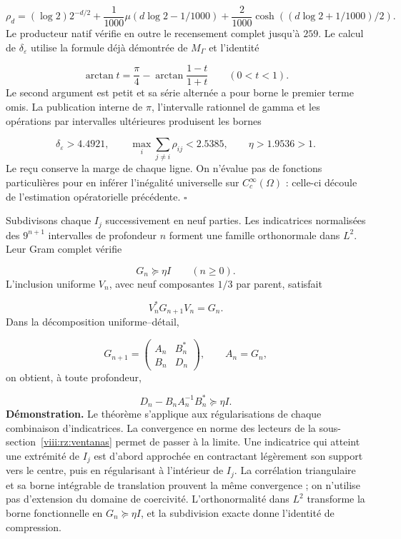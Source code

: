 \[
\rho_d=(\log2)2^{-d/2}
+\frac1{1000}\mu(d\log2-1/1000)
+\frac2{1000}\cosh((d\log2+1/1000)/2).
\]
Le producteur natif vérifie en outre le recensement complet jusqu'à \(259\). Le calcul de \(\delta_\varepsilon\) utilise la formule déjà démontrée de \(M_\Gamma\) et l'identité

\[
\arctan t=\frac\pi4-
\arctan\frac{1-t}{1+t}\qquad(0<t<1).
\]
Le second argument est petit et sa série alternée a pour borne le premier terme omis. La publication interne de \(\pi\), l’intervalle rationnel de gamma et les opérations par intervalles ultérieures produisent les bornes

\[
\delta_\varepsilon>4.4921,\qquad
\max_i\sum_{j\neq i}\rho_{ij}<2.5385,\qquad
\eta>1.9536>1.
\]
Le reçu conserve la marge de chaque ligne. On n'évalue pas de fonctions particulières pour en inférer l'inégalité universelle sur \(C_c^\infty(\Omega)\) : celle-ci découle de l'estimation opératorielle précédente. \hfill\(\square\)

Subdivisons chaque \(I_j\) successivement en neuf parties. Les indicatrices normalisées des \(9^{n+1}\) intervalles de profondeur \(n\) forment une famille orthonormale dans \(L^2\). Leur Gram complet vérifie

\[
G_n\succeq\eta I\qquad(n\geq0).
\]
L’inclusion uniforme \(V_n\), avec neuf composantes \(1/3\) par parent, satisfait

\[
V_n^*G_{n+1}V_n=G_n.
\]
Dans la décomposition uniforme–détail,

\[
G_{n+1}=\begin{pmatrix}A_n&B_n^*\\B_n&D_n\end{pmatrix},
\qquad A_n=G_n,
\]
on obtient, à toute profondeur,

\[
\boxed{D_n-B_nA_n^{-1}B_n^*\succeq\eta I.}
\]
\textbf{Démonstration.} Le théorème s’applique aux régularisations de chaque combinaison d’indicatrices. La convergence en norme des lecteurs de la sous-section~\ref{viii:rz:ventanas} permet de passer à la limite. Une indicatrice qui atteint une extrémité de \(I_j\) est d’abord approchée en contractant légèrement son support vers le centre, puis en régularisant à l’intérieur de \(I_j\). La corrélation triangulaire et sa borne intégrable de translation prouvent la même convergence ; on n’utilise pas d’extension du domaine de coercivité. L’orthonormalité dans \(L^2\) transforme la borne fonctionnelle en \(G_n\succeq\eta I\), et la subdivision exacte donne l’identité de compression.


